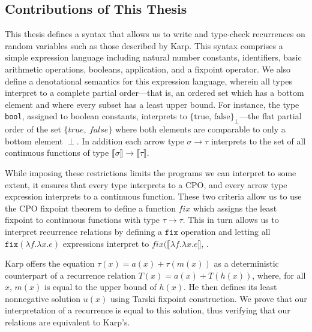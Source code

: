 \subsection{Contributions of This Thesis}

This thesis defines a syntax that allows us to write and type-check recurrences on
random variables such as those described by Karp. This syntax comprises a simple expression language including natural number constants, identifiers, basic arithmetic operations, booleans, application, and a fixpoint operator. We also define a 
denotational semantics for this expression language, wherein all types interpret to a complete partial order---that is, an ordered
set which has a bottom element and where every subset has a least upper bound. For instance, the type {\tt bool}, assigned
to boolean constants, interprets to $\{\text{true, false}\}_{\perp}$---the flat partial order of the set  $\{true, 
\ false\}$ where
both elements are comparable to only a bottom element $\perp$. In addition each arrow type $\sigma 
\rightarrow \tau$ interprets to the set of all continuous functions of type $\llbracket \sigma \rrbracket \rightarrow 
\llbracket \tau \rrbracket$. 
 
 While imposing these restrictions limits the programs we can interpret to some extent, it ensures 
that every type interprets to a CPO, and every arrow type expression interprets to a continuous function. These two 
criteria allow us to use the CPO fixpoint theorem to define a function $fix$ which assigns the least fixpoint to continuous functions with type $\tau \rightarrow \tau$. This in turn allows us to interpret recurrence relations by defining a $\texttt{fix}$ operation and letting all $\texttt{fix}(\lambda f.\lambda x.e)$ expressions interpret to $fix(\llbracket\lambda f.\lambda x.e\rrbracket$, .

Karp offers the equation $\tau(x) = a(x) + \tau(m(x))$ as a deterministic counterpart of a recurrence relation $T(x) = a(x) + 
T(h(x))$, where, for all $x$, $m(x)$ is equal to the upper bound of $h(x)$. He then defines its least nonnegative solution 
$u(x)$ using Tarski fixpoint construction. We prove that our interpretation of a recurrence is equal to this solution, thus 
verifying that our relations are equivalent to Karp's. 